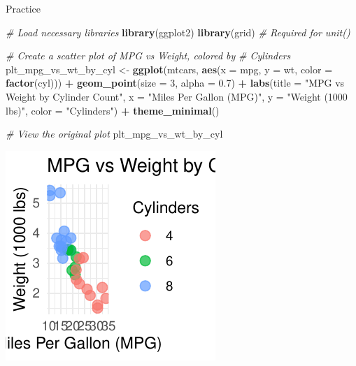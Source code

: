 \documentclass[
  ignorenonframetext,
]{beamer}
\newenvironment{Shaded}{\begin{snugshade}}{\end{snugshade}}
\newcommand{\AttributeTok}[1]{\textcolor[rgb]{0.13,0.29,0.53}{#1}}
\newcommand{\CommentTok}[1]{\textcolor[rgb]{0.56,0.35,0.01}{\textit{#1}}}
\newcommand{\DecValTok}[1]{\textcolor[rgb]{0.00,0.00,0.81}{#1}}
\newcommand{\FloatTok}[1]{\textcolor[rgb]{0.00,0.00,0.81}{#1}}
\newcommand{\FunctionTok}[1]{\textcolor[rgb]{0.13,0.29,0.53}{\textbf{#1}}}
\newcommand{\NormalTok}[1]{#1}
\newcommand{\OtherTok}[1]{\textcolor[rgb]{0.56,0.35,0.01}{#1}}
\newcommand{\SpecialCharTok}[1]{\textcolor[rgb]{0.81,0.36,0.00}{\textbf{#1}}}
\newcommand{\StringTok}[1]{\textcolor[rgb]{0.31,0.60,0.02}{#1}}
\begin{document}
\begin{frame}[fragile]{Practice}
\label{practice-5}

\begin{Shaded}
\begin{Highlighting}[]
\CommentTok{\# Load necessary libraries}
\FunctionTok{library}\NormalTok{(ggplot2)}
\FunctionTok{library}\NormalTok{(grid)  }\CommentTok{\# Required for unit()}

\CommentTok{\# Create a scatter plot of MPG vs Weight, colored by}
\CommentTok{\# Cylinders}
\NormalTok{plt\_mpg\_vs\_wt\_by\_cyl }\OtherTok{\textless{}{-}} \FunctionTok{ggplot}\NormalTok{(mtcars, }\FunctionTok{aes}\NormalTok{(}\AttributeTok{x =}\NormalTok{ mpg, }\AttributeTok{y =}\NormalTok{ wt, }\AttributeTok{color =} \FunctionTok{factor}\NormalTok{(cyl))) }\SpecialCharTok{+}
    \FunctionTok{geom\_point}\NormalTok{(}\AttributeTok{size =} \DecValTok{3}\NormalTok{, }\AttributeTok{alpha =} \FloatTok{0.7}\NormalTok{) }\SpecialCharTok{+} \FunctionTok{labs}\NormalTok{(}\AttributeTok{title =} \StringTok{"MPG vs Weight by Cylinder Count"}\NormalTok{,}
    \AttributeTok{x =} \StringTok{"Miles Per Gallon (MPG)"}\NormalTok{, }\AttributeTok{y =} \StringTok{"Weight (1000 lbs)"}\NormalTok{, }\AttributeTok{color =} \StringTok{"Cylinders"}\NormalTok{) }\SpecialCharTok{+}
    \FunctionTok{theme\_minimal}\NormalTok{()}
\end{Highlighting}
\end{Shaded}


\begin{Shaded}
\begin{Highlighting}[]
\CommentTok{\# View the original plot}
\NormalTok{plt\_mpg\_vs\_wt\_by\_cyl}
\end{Highlighting}
\end{Shaded}

\begin{center}\includegraphics[width=0.5\linewidth]{Figs/unnamed-chunk-72-1} \end{center}


\end{frame}
\end{document}
